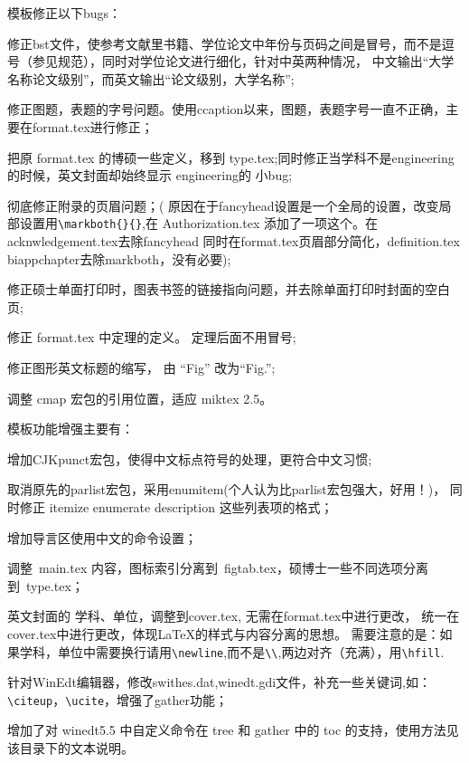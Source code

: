 模板修正以下bugs：
\begin{hitlist}
  \item 修正bst文件，使参考文献里书籍、学位论文中年份与页码之间是冒号，而不是逗号（参见规范），同时对学位论文进行细化，针对中英两种情况，
中文输出``大学名称论文级别''，而英文输出``论文级别，大学名称'';
  \item 修正图题，表题的字号问题。使用ccaption以来，图题，表题字号一直不正确，主要在format.tex进行修正；
  \item 把原 format.tex 的博硕一些定义，移到 type.tex;同时修正当学科不是engineering的时候，英文封面却始终显示 engineering的 小bug;
  \item 彻底修正附录的页眉问题；( 原因在于fancyhead设置是一个全局的设置，改变局部设置用\verb|\markboth{}{}|,在 Authorization.tex 添加了一项这个。在acknwledgement.tex去除fancyhead
  同时在format.tex页眉部分简化，definition.tex biappchapter去除markboth，没有必要);
  \item 修正硕士单面打印时，图表书签的链接指向问题，并去除单面打印时封面的空白页;
  \item 修正 format.tex 中定理的定义。 定理后面不用冒号;
  \item 修正图形英文标题的缩写， 由 ``Fig'' 改为``Fig.'';
  \item 调整 cmap 宏包的引用位置，适应 miktex 2.5。
\end{hitlist}

模板功能增强主要有：
\begin{hitlist}
  \item 增加CJKpunct宏包，使得中文标点符号的处理，更符合中文习惯;
  \item 取消原先的parlist宏包，采用enumitem(个人认为比parlist宏包强大，好用！)，
         同时修正 itemize enumerate description 这些列表项的格式；
  \item 增加导言区使用中文的命令设置；
  \item 调整~main.tex 内容，图标索引分离到~figtab.tex，硕博士一些不同选项分离到~type.tex；
  \item 英文封面的 学科、单位，调整到cover.tex, 无需在format.tex中进行更改， 统一在cover.tex中进行更改，体现LaTeX的样式与内容分离的思想。
   需要注意的是：如果学科，单位中需要换行请用\verb|\newline|,而不是\verb|\\|,两边对齐（充满），用\verb|\hfill|.
  \item 针对WinEdt编辑器，修改swithes.dat,winedt.gdi文件，补充一些关键词,如：\verb|\citeup|，\verb|\ucite|，增强了gather功能；
  \item 增加了对 winedt5.5 中自定义命令在 tree 和 gather 中的 toc 的支持，使用方法见该目录下的文本说明。
\end{hitlist}


